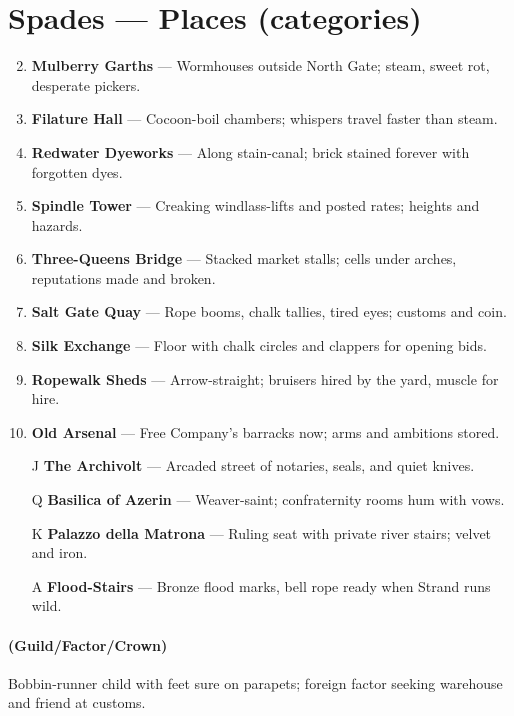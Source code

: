 \section*{Spades --- Places (categories)}
\label{sec:silkstrand-places}
\begin{enumerate}
\setcounter{enumi}{1}
\item \textbf{Mulberry Garths} --- Wormhouses outside North Gate; steam, sweet rot, desperate pickers.
\item \textbf{Filature Hall} --- Cocoon-boil chambers; whispers travel faster than steam.
\item \textbf{Redwater Dyeworks} --- Along stain-canal; brick stained forever with forgotten dyes.
\item \textbf{Spindle Tower} --- Creaking windlass-lifts and posted rates; heights and hazards.
\item \textbf{Three-Queens Bridge} --- Stacked market stalls; cells under arches, reputations made and broken.
\item \textbf{Salt Gate Quay} --- Rope booms, chalk tallies, tired eyes; customs and coin.
\item \textbf{Silk Exchange} --- Floor with chalk circles and clappers for opening bids.
\item \textbf{Ropewalk Sheds} --- Arrow-straight; bruisers hired by the yard, muscle for hire.
\item \textbf{Old Arsenal} --- Free Company's barracks now; arms and ambitions stored.
\item[J] \textbf{The Archivolt} --- Arcaded street of notaries, seals, and quiet knives.
\item[Q] \textbf{Basilica of Azerin} --- Weaver-saint; confraternity rooms hum with vows.
\item[K] \textbf{Palazzo della Matrona} --- Ruling seat with private river stairs; velvet and iron.
\item[A] \textbf{Flood-Stairs} --- Bronze flood marks, bell rope ready when Strand runs wild.
\end{enumerate}

\paragraph*{(Guild/Factor/Crown)} Bobbin-runner child with feet sure on parapets; foreign factor seeking warehouse and friend at customs.

